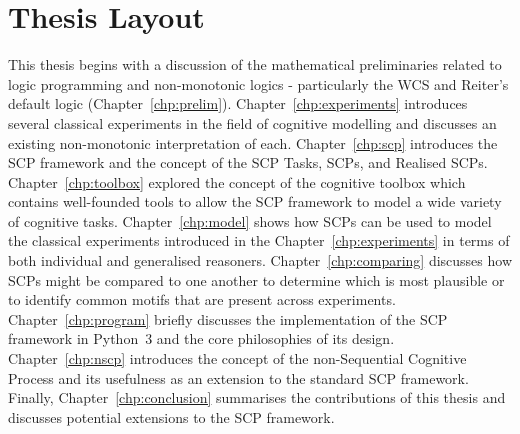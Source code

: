 \section{Thesis Layout} \label{sec:layout}
This thesis begins with a discussion of the mathematical preliminaries related to logic programming and non-monotonic logics - particularly the WCS and Reiter's default logic (Chapter~\ref{chp:prelim}). Chapter~\ref{chp:experiments} introduces several classical experiments in the field of cognitive modelling and discusses an existing non-monotonic interpretation of each. Chapter~\ref{chp:scp} introduces the SCP framework and the concept of the SCP Tasks, SCPs, and Realised SCPs. Chapter~\ref{chp:toolbox} explored the concept of the cognitive toolbox which contains well-founded tools to allow the SCP framework to model a wide variety of cognitive tasks. Chapter~\ref{chp:model} shows how SCPs can be used to model the classical experiments introduced in the Chapter~\ref{chp:experiments} in terms of both individual and generalised reasoners. Chapter~\ref{chp:comparing} discusses how SCPs might be compared to one another to determine which is most plausible or to identify common motifs that are present across experiments. Chapter~\ref{chp:program} briefly discusses the implementation of the SCP framework in Python~3 and the core philosophies of its design. Chapter~\ref{chp:nscp} introduces the concept of the non-Sequential Cognitive Process and its usefulness as an extension to the standard SCP framework. Finally, Chapter~\ref{chp:conclusion} summarises the contributions of this thesis and discusses potential extensions to the SCP framework.